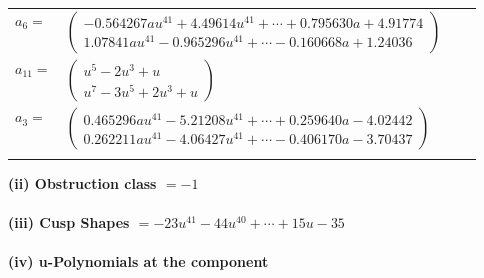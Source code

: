 \documentclass[1p]{elsarticle_modified}
\theoremstyle{definition}
\begin{document}
\begin{tabular}{m{7pt} m{180pt} m{7pt} m{180pt} }
\flushright $a_{6}=$&$\begin{pmatrix}-0.564267 a u^{41}+4.49614 u^{41}+\cdots+0.795630 a+4.91774\\1.07841 a u^{41}-0.965296 u^{41}+\cdots-0.160668 a+1.24036\end{pmatrix}$ \\
\flushright $a_{11}=$&$\begin{pmatrix}u^5-2 u^3+u\\u^7-3 u^5+2 u^3+u\end{pmatrix}$ \\
\flushright $a_{3}=$&$\begin{pmatrix}0.465296 a u^{41}-5.21208 u^{41}+\cdots+0.259640 a-4.02442\\0.262211 a u^{41}-4.06427 u^{41}+\cdots-0.406170 a-3.70437\end{pmatrix}$\\&\end{tabular}
\flushleft \textbf{(ii) Obstruction class $= -1$}\\~\\
\flushleft \textbf{(iii) Cusp Shapes $= -23 u^{41}-44 u^{40}+\cdots+15 u-35$}\\~\\
\newpage\renewcommand{\arraystretch}{1}
\flushleft \textbf{(iv) u-Polynomials at the component}\newline \\
\end{document}
